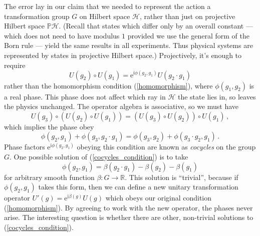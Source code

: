 \documentclass{article}
\theoremstyle{plain}\theoremheaderfont{\normalfont\itshape}\theorembodyfont{\rmfamily}\theoremseparator{.}\newtheorem*{rem}{Remark}\newtheorem*{ex}{Example}\newtheorem*{proof}{Proof}\newtheorem*{altp}{Alternative proof}
\theoremstyle{plain}\theoremheaderfont{\normalfont\bfseries}\theorembodyfont{\rmfamily}\theoremseparator{.}\newtheorem{thm}{Theorem}[section]\newtheorem{lem}[thm]{Lemma}\newtheorem{prop}[thm]{Proposition}\newtheorem*{cor}{Corollary}\newtheorem{defn}[thm]{Definition}\newtheorem{clm}[thm]{Claim}\newtheorem{clminproof}{Claim}
\theoremstyle{break}\theoremheaderfont{\normalfont\itshape}\theorembodyfont{\rmfamily}\theoremseparator{.\medskip}\newtheorem*{proofskip}{Proof}\newtheorem*{exs}{Examples}\newtheorem*{rems}{Remarks}
\theoremstyle{break}\theoremheaderfont{\normalfont\bfseries}\theorembodyfont{\rmfamily}\theoremseparator{.\medskip}\newtheorem{lemskip}[thm]{Lemma}\newtheorem{defnskip}[thm]{Definition}\newtheorem{propskip}[thm]{Proposition}\newtheorem{thmskip}[thm]{Theorem}
\numberwithin{equation}{section}
\newcommand{\ii}{\mathrm{i}}
\newcommand{\ee}{\mathrm{e}}
\newcommand{\hb}{\mathcal{H}}
\newcommand{\ph}{\mathbb{P}\mathcal{H}}
\newcommand{\RR}{\mathbb{R}}
\begin{document}
    The error lay in our claim that we needed to represent the action a transformation group \(G\) on Hilbert space \(\hb\), rather than just on projective Hilbert space \(\ph\). (Recall that states which differ only by an overall constant --- which does not need to have modulus \(1\) provided we use the general form of the Born rule --- yield the same results in all experiments. Thus physical systems are represented by states in projective Hilbert space.) Projectively, it's enough to require
    \begin{equation}\label{projective_homomorphism}
        U(g_2)\circ U(g_1)=\ee^{\ii \phi(g_2,g_1)}U(g_2\cdot g_1)
    \end{equation}
    rather than the homomorphism condition (\ref{homomorphism}), where \(\phi(g_1,g_2)\) is a real phase. This phase does not affect which ray in \(\hb\) the state lies in, so leaves the physics unchanged. The operator algebra is associative, so we must have
    \begin{equation}
        U(g_3)\circ(U(g_2)\circ U(g_1))=(U(g_3)\circ U(g_2))\circ U(g_1)\,,
    \end{equation}
    which implies the phase obey
    \begin{equation}\label{cocycles_condition}
        \phi(g_2,g_1)+\phi(g_3,g_2\cdot g_1)=\phi(g_3,g_2)+\phi(g_3\cdot g_2,g_1)\,.
    \end{equation}
    Phase factors \(\ee^{\ii \phi(g_2,g_1)}\) obeying this condition are known as \textit{cocycles} on the group \(G\). One possible solution of (\ref{cocycles_condition}) is to take
    \begin{equation}
        \phi(g_2,g_1)=\beta(g_2\cdot g_1)-\beta(g_2)-\beta(g_1)
    \end{equation}
    for arbitrary smooth function \(\beta:G\to\RR\). This solution is ``trivial'', because if \(\phi(g_2,g_1)\) takes this form, then we can define a new unitary transformation operator \(U'(g)=\ee^{\ii \beta(g)}U(g)\) which obeys our original condition (\ref{homomorphism}). By agreeing to work with the new operator, the phases never arise. The interesting question is whether there are other, non-trivial solutions to (\ref{cocycles_condition}).
\end{document}
